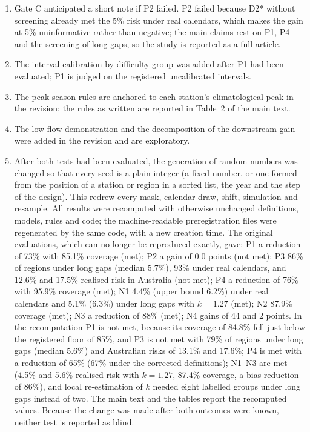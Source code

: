 \documentclass[draft]{agujournal2025}
\begin{document}
\begin{enumerate}
\item Gate C anticipated a short note if P2 failed. P2 failed because D2* without screening already met the 5\% risk under real calendars, which makes the gain at 5\% uninformative rather than negative; the main claims rest on P1, P4 and the screening of long gaps, so the study is reported as a full article.
\item The interval calibration by difficulty group was added after P1 had been evaluated; P1 is judged on the registered uncalibrated intervals.
\item The peak-season rules are anchored to each station's climatological peak in the revision; the rules as written are reported in Table~2 of the main text.
\item The low-flow demonstration and the decomposition of the downstream gain were added in the revision and are exploratory.
\item After both tests had been evaluated, the generation of random numbers was changed so that every seed is a plain integer (a fixed number, or one formed from the position of a station or region in a sorted list, the year and the step of the design). This redrew every mask, calendar draw, shift, simulation and resample. All results were recomputed with otherwise unchanged definitions, models, rules and code; the machine-readable preregistration files were regenerated by the same code, with a new creation time. The original evaluations, which can no longer be reproduced exactly, gave: P1 a reduction of 73\% with 85.1\% coverage (met); P2 a gain of 0.0 points (not met); P3 86\% of regions under long gaps (median 5.7\%), 93\% under real calendars, and 12.6\% and 17.5\% realised risk in Australia (not met); P4 a reduction of 76\% with 95.9\% coverage (met); N1 4.4\% (upper bound 6.2\%) under real calendars and 5.1\% (6.3\%) under long gaps with $k=1.27$ (met); N2 87.9\% coverage (met); N3 a reduction of 88\% (met); N4 gains of 44 and 2 points. In the recomputation P1 is not met, because its coverage of 84.8\% fell just below the registered floor of 85\%, and P3 is not met with 79\% of regions under long gaps (median 5.6\%) and Australian risks of 13.1\% and 17.6\%; P4 is met with a reduction of 65\% (67\% under the corrected definitions); N1--N3 are met (4.5\% and 5.6\% realised risk with $k=1.27$, 87.4\% coverage, a bias reduction of 86\%), and local re-estimation of $k$ needed eight labelled groups under long gaps instead of two. The main text and the tables report the recomputed values. Because the change was made after both outcomes were known, neither test is reported as blind.
\end{enumerate}
\end{document}
